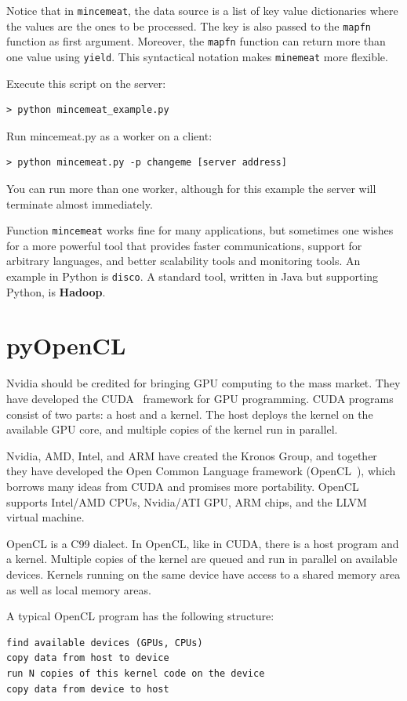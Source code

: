 \documentclass[justified, sixbynine]{tufte-book}
\def\ft{\small\tt}
\theoremstyle{plain}%
\newtheorem * {corollary}{Corollary}
\theoremstyle{definition}
\theoremstyle{remark}
\newtheorem * {remark}{Remark}
\newtheorem * {note}{Note}
\begin{document}
\begin{fullwidth}
Notice that in {\ft mincemeat}, the data source is a list of key value dictionaries where the values are the ones to be processed. The key is also passed to the {\ft mapfn} function as first argument. Moreover, the {\ft mapfn} function can return more than one value using {\ft yield}. This syntactical notation makes {\ft minemeat} more flexible.

Execute this script on the server:
\begin{lstlisting}
> python mincemeat_example.py
\end{lstlisting}
Run mincemeat.py as a worker on a client:
\begin{lstlisting}
> python mincemeat.py -p changeme [server address]
\end{lstlisting}
You can run more than one worker, although for this example the server will terminate almost immediately.

Function {\ft mincemeat} works fine for many applications, but sometimes one wishes for a more powerful tool that provides faster communications, support for arbitrary languages, and better scalability tools and monitoring tools. An example in Python is {\ft disco}. A standard tool, written in Java but supporting Python, is {\bf Hadoop}.

\goodbreak\section{pyOpenCL}

Nvidia should be credited for bringing GPU computing to the mass market. They have developed the CUDA~\cite{cuda} framework for GPU programming. CUDA programs consist of two parts: a host and a kernel. The host deploys the kernel on the available GPU core, and multiple copies of the kernel run in parallel.

Nvidia, AMD, Intel, and ARM have created the Kronos Group, and together they have developed the Open Common Language framework (OpenCL~\cite{opencl}), which borrows many ideas from CUDA and promises more portability. OpenCL supports
Intel/AMD CPUs, Nvidia/ATI GPU, ARM chips, and the LLVM virtual machine.

OpenCL is a C99 dialect. In OpenCL, like in CUDA, there is a host program and a kernel. Multiple copies of the kernel are queued and run in parallel on available devices. Kernels running on the same device have access to a shared memory area as well as local memory areas.

A typical OpenCL program has the following structure:
\begin{lstlisting}
find available devices (GPUs, CPUs)
copy data from host to device
run N copies of this kernel code on the device
copy data from device to host
\end{lstlisting}


\end{fullwidth}
\end{document}
